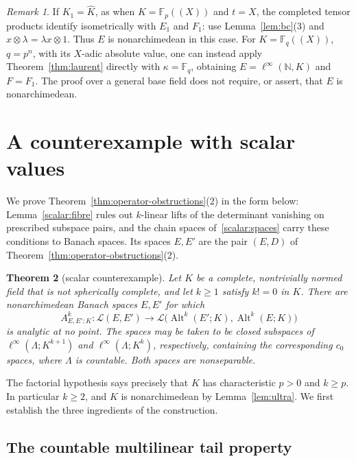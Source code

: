 \documentclass[11pt]{amsart}
\newtheorem{theorem}{Theorem}[section]
\theoremstyle{definition}
\theoremstyle{remark}
\newtheorem{remark}[theorem]{Remark}
\numberwithin{equation}{section}
\newcommand{\N}{\mathbb N}
\newcommand{\F}{\mathbb F}
\newcommand{\cL}{\mathcal L}
\newcommand{\Alt}{\operatorname{Alt}}
\newcommand{\linf}{\ell^\infty}
\newcommand{\Kh}{\widehat K}
\theoremstyle{plain}
\theoremstyle{definition}
\theoremstyle{plain}
\begin{document}
\begin{remark}\label{rem:spaces}
If $K_1=\Kh$, as when $K=\F_p((X))$ and $t=X$, the completed tensor products identify isometrically with
$E_1$ and $F_1$: use Lemma~\ref{lem:bc}(3) and $x\otimes\lambda=\lambda x\otimes1$. Thus $E$ is nonarchimedean in
this case. For $K=\F_q((X))$, $q=p^n$, with its $X$\nobreakdash-adic absolute value, one can instead apply
Theorem~\ref{thm:laurent} directly with $\kappa=\F_q$, obtaining $E=\linf(\N,K)$ and $F=F_1$.
The proof over a general base field does not require, or assert, that $E$ is nonarchimedean.
\end{remark}
\section{A counterexample with scalar values}\label{app:scalar}

We prove Theorem~\ref{thm:operator-obstructions}(2) in the form below: Lemma~\ref{scalar:fibre} rules out $k$\nobreakdash-linear
lifts of the determinant vanishing on prescribed subspace pairs, and the chain spaces of~\eqref{scalar:spaces} carry
these conditions to Banach spaces. Its spaces $E,E'$ are the pair $(E,D)$ of Theorem~\ref{thm:operator-obstructions}(2).

\begin{theorem}[scalar counterexample]\label{thm:scalar-counter}
Let $K$ be a complete, nontrivially normed field that is not spherically complete, and let $k\ge1$ satisfy
$k! = 0$ in $K$. There are nonarchimedean Banach spaces $E,E'$ for which
\[
 A^k_{E,E';K}\colon\cL(E,E')\longrightarrow
 \cL\bigl(\Alt^k(E';K),\Alt^k(E;K)\bigr)
\]
is analytic at no point. The spaces may be taken to be closed subspaces of
$\linf(\Lambda;K^{k+1})$ and $\linf(\Lambda;K^k)$, respectively, containing the corresponding $c_0$ spaces,
where $\Lambda$ is countable. Both spaces are nonseparable.
\end{theorem}

The factorial hypothesis says precisely that $K$ has characteristic $p>0$ and $k\ge p$. In particular
$k\ge2$, and $K$ is nonarchimedean by Lemma~\ref{lem:ultra}. We first establish the three ingredients
of the construction.

\subsection{The countable multilinear tail property}
\end{document}
